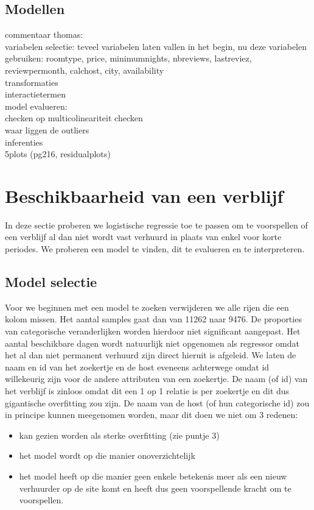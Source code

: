 \documentclass[a4paper,kulak]{kulakarticle} %
\begin{document}
\subsection{Modellen}
commentaar thomas:\\
variabelen selectie: teveel variabelen laten vallen in het begin, nu deze variabelen gebruiken: roomtype, price, minimumnights, nbreviews, lastreviez, reviewpermonth, calchost, city, availability \\
transformaties\\
interactietermen\\

model evalueren:\\
checken op multicolineariteit checken\\
waar liggen de outliers\\
inferenties\\
5plots (pg216, residualplots)

\section{Beschikbaarheid van een verblijf}
In deze sectie proberen we logistische regressie toe te passen om te voorspellen of een verblijf al dan niet wordt vast verhuurd in plaats van enkel voor korte periodes.
We proberen een model te vinden, dit te evalueren en te interpreteren.
\subsection{Model selectie}
Voor we beginnen met een model te zoeken verwijderen we alle rijen die een kolom missen. Het aantal samples gaat dan van 11262 naar 9476.
De proporties van categorische veranderlijken worden hierdoor niet significant aangepast.
Het aantal beschikbare dagen wordt natuurlijk niet opgenomen als regressor omdat het al dan niet permanent verhuurd zijn direct hieruit is afgeleid.
We laten de naam en id van het zoekertje en de host eveneens achterwege omdat id willekeurig zijn voor de andere attributen van een zoekertje.
De naam (of id) van het verblijf is zinloos omdat dit een 1 op 1 relatie is per zoekertje en dit dus gigantische overfitting zou zijn.
De naam van de host (of hun categorische id) zou in principe kunnen meegenomen worden, maar dit doen we niet om 3 redenen:
\begin{itemize}
	\item kan gezien worden als sterke overfitting (zie puntje 3)
	\item het model wordt op die manier onoverzichtelijk 
	\item het model heeft op die manier geen enkele betekenis meer als een nieuw verhuurder op de site komt en heeft dus geen voorspellende kracht om te voorspellen. 
\end{itemize}
\end{document}
